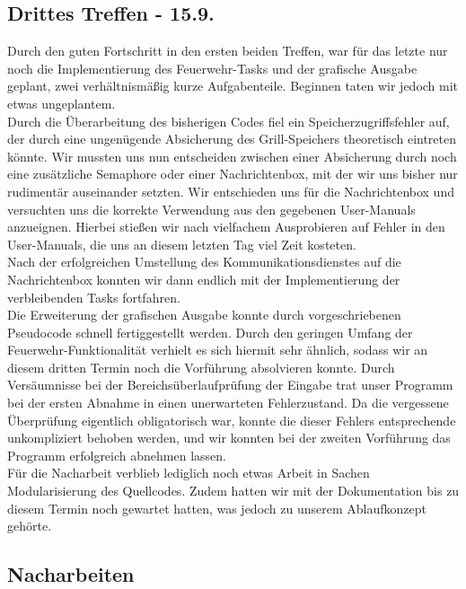 \subsection{Drittes Treffen - 15.9.}

Durch den guten Fortschritt in den ersten beiden Treffen, war für das letzte nur noch die Implementierung des Feuerwehr-Tasks und der grafische Ausgabe geplant, zwei verhältnismäßig kurze Aufgabenteile. Beginnen taten wir jedoch mit etwas ungeplantem.\\
Durch die Überarbeitung des bisherigen Codes fiel ein Speicherzugriffsfehler auf, der durch eine ungenügende Absicherung des Grill-Speichers theoretisch eintreten könnte. Wir mussten uns nun entscheiden zwischen einer Absicherung durch noch eine zusätzliche Semaphore oder einer Nachrichtenbox, mit der wir uns bisher nur rudimentär auseinander setzten. Wir entschieden uns für die Nachrichtenbox und versuchten uns die korrekte Verwendung aus den gegebenen User-Manuals anzueignen. Hierbei stießen wir nach vielfachem Ausprobieren auf Fehler in den User-Manuals, die uns an diesem letzten Tag viel Zeit kosteten.\\

Nach der erfolgreichen Umstellung des Kommunikationsdienstes auf die Nachrichtenbox konnten wir dann endlich mit der Implementierung der verbleibenden Tasks fortfahren.\\
Die Erweiterung der grafischen Ausgabe konnte durch vorgeschriebenen Pseudocode schnell fertiggestellt werden. Durch den geringen Umfang der Feuerwehr-Funktionalität verhielt es sich hiermit sehr ähnlich, sodass wir an diesem dritten Termin noch die Vorführung absolvieren konnte. Durch Versäumnisse bei der Bereichsüberlaufprüfung der Eingabe trat unser Programm bei der ersten Abnahme in einen unerwarteten Fehlerzustand. Da die vergessene Überprüfung eigentlich obligatorisch war, konnte die dieser Fehlers entsprechende unkompliziert behoben werden, und wir konnten bei der zweiten Vorführung das Programm erfolgreich abnehmen lassen.\\

Für die Nacharbeit verblieb lediglich noch etwas Arbeit in Sachen Modularisierung des Quellcodes. Zudem hatten wir mit der Dokumentation bis zu diesem Termin noch gewartet hatten, was jedoch zu unserem Ablaufkonzept gehörte.

\subsection{Nacharbeiten}

